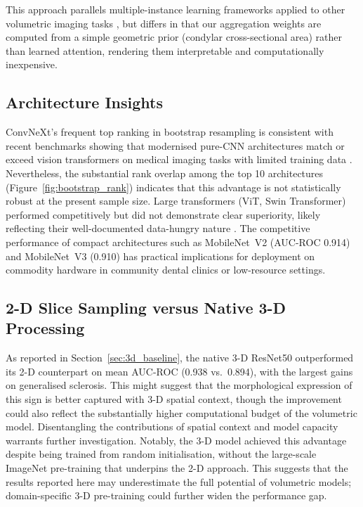 \documentclass[review,12pt]{elsarticle}
\begin{document}
This approach parallels multiple-instance learning frameworks applied
to other volumetric imaging tasks \cite{ilse2018attention,campanella2019clinical}, but
differs in that our aggregation weights are computed from a simple
geometric prior (condylar cross-sectional area) rather than learned
attention, rendering them interpretable and computationally inexpensive.

\subsection{Architecture Insights}

ConvNeXt's frequent top ranking in bootstrap resampling is consistent
with recent benchmarks showing that modernised pure-CNN architectures
match or exceed vision transformers on medical imaging tasks with
limited training data \cite{liu2022convnet}. Nevertheless, the
substantial rank overlap among the top 10 architectures
(Figure~\ref{fig:bootstrap_rank}) indicates that this advantage is not
statistically robust at the present sample size. Large transformers
(ViT, Swin Transformer) performed competitively but did not demonstrate
clear superiority, likely reflecting their well-documented data-hungry
nature \cite{dosovitskiy2020image,raghu2021vision}. The competitive
performance of compact architectures such as MobileNet~V2 (AUC-ROC
0.914) and MobileNet~V3 (0.910) has practical implications for
deployment on commodity hardware in community dental clinics or
low-resource settings.

\subsection{2-D Slice Sampling versus Native 3-D Processing}

As reported in Section~\ref{sec:3d_baseline}, the native 3-D ResNet50
outperformed its 2-D counterpart on mean AUC-ROC (0.938 vs.\ 0.894),
with the largest gains on generalised sclerosis. This
might suggest that the morphological expression of this sign is
better captured with 3-D spatial context, though the improvement could
also reflect the substantially higher computational budget of the
volumetric model. Disentangling the contributions of spatial context
and model capacity warrants further investigation. Notably, the 3-D
model achieved this advantage despite being trained from random
initialisation, without the large-scale ImageNet pre-training that
underpins the 2-D approach. This suggests that the results reported
here may underestimate the full potential of volumetric models;
domain-specific 3-D pre-training could further widen the
performance gap.
\end{document}
